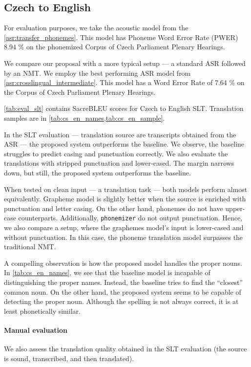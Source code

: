 \subsection{Czech to English}
For evaluation purposes, we take the acoustic model from the \cref{asr:transfer_phonemes}. This model has Phoneme Word Error Rate (PWER) 8.94 \% on the phonemized Corpus of Czech Parliament Plenary Hearings.

We compare our proposal with a more typical setup --- a standard ASR followed by an NMT. We employ the best performing ASR model from \cref{asr:crosslingual_intermediate}. This model has a Word Error Rate of 7.64 \% on the Corpus of Czech Parliament Plenary Hearings.

\cref{tab:eval_slt} contains SacreBLEU scores for Czech to English SLT. Translation samples are in \cref{tab:cs_en_names,tab:cs_en_sample}.

In the SLT evaluation --- translation source are transcripts obtained from the ASR --- the proposed system outperforms the baseline. We observe, the baseline struggles to predict casing and punctuation correctly. We also evaluate the translations with stripped punctuation and lower-cased. The margin narrows down, but still, the proposed system outperforms the baseline.

When tested on clean input --- a translation task --- both models perform almost equivalently. Grapheme model is slightly better when the source is enriched with punctuation and letter casing. On the other hand, phonemes do not have upper-case counterparts. Additionally, \texttt{phonemizer} do not output punctuation. Hence, we also compare a setup, where the graphemes model's input is lower-cased and without punctuation. In this case, the phoneme translation model surpasses the traditional NMT. 

A compelling observation is how the proposed model handles the proper nouns. In \cref{tab:cs_en_names}, we see that the baseline model is incapable of distinguishing the proper names. Instead, the baseline tries to find the ``closest'' common noun. On the other hand, the proposed system seems to be capable of detecting the proper noun. Although the spelling is not always correct, it is at least phonetically similar.

\paragraph{Manual evaluation}
We also assess the translation quality obtained in the SLT evaluation (the source is sound, transcribed, and then translated). 

